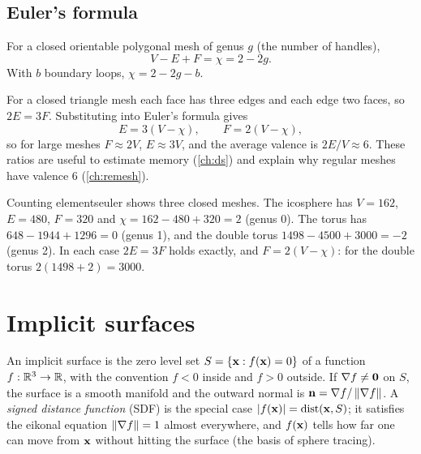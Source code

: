 \subsection{Euler's formula}

\begin{theorem}
For a closed orientable polygonal mesh of genus $g$ (the number of handles),
\begin{equation}
V-E+F=\chi=2-2g .
\end{equation}
With $b$ boundary loops, $\chi=2-2g-b$.
\end{theorem}

For a closed triangle mesh each face has three edges and each edge two faces, so $2E=3F$.
Substituting into Euler's formula gives
\begin{equation}
E=3(V-\chi),\qquad F=2(V-\chi),
\end{equation}
so for large meshes $F\approx 2V$, $E\approx 3V$, and the average valence is $2E/V\approx 6$.
These ratios are useful to estimate memory (\cref{ch:ds}) and explain why regular meshes have
valence 6 (\cref{ch:remesh}).

\begin{example}{Counting elements}{euler}
 shows three closed meshes. The icosphere has $V=162$, $E=480$, $F=320$ and
$\chi=162-480+320=2$ (genus 0). The torus has $648-1944+1296=0$ (genus 1), and the double torus
$1498-4500+3000=-2$ (genus 2). In each case $2E=3F$ holds exactly, and $F=2(V-\chi)$:
for the double torus $2(1498+2)=3000$.
\end{example}


\section{Implicit surfaces}\label{sec:implicit}

An implicit surface is the zero level set $S=\{\mathbf{x}: f(\mathbf{x})=0\}$ of a function $f:\mathbb{R}^3\to\mathbb{R}$, with
the convention $f<0$ inside and $f>0$ outside. If $\nabla f\neq\mathbf{0}$ on $S$, the surface is a
smooth manifold and the outward normal is $\mathbf{n}=\nabla f/\left\lVert \nabla f\right\rVert$. A \emph{signed distance
function} (SDF) is the special case $\left\lvert f(\mathbf{x})\right\rvert=\operatorname{dist}(\mathbf{x},S)$; it satisfies the
eikonal equation $\left\lVert \nabla f\right\rVert=1$ almost everywhere, and $f(\mathbf{x})$ tells how far one can move
from $\mathbf{x}$ without hitting the surface (the basis of sphere tracing).

